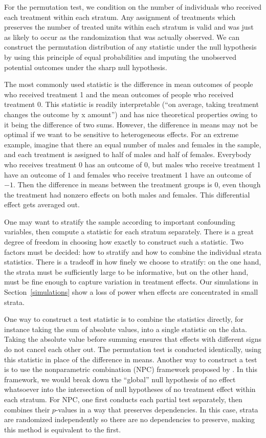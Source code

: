 \documentclass[11pt]{article}
\begin{document}
For the permutation test, we condition on the number of individuals who received each treatment within each stratum.
Any assignment of treatments which preserves the number of treated units within each stratum is valid and was just as likely to occur as the randomization that was actually observed.
We can construct the permutation distribution of any statistic under the null hypothesis by using this principle of equal probabilities and imputing the unobserved potential outcomes under the sharp null hypothesis.

The most commonly used statistic is the difference in mean outcomes of people who received treatment 1 and the mean outcomes of people who received treatment 0.  
This statistic is readily interpretable (``on average, taking treatment changes the outcome by x amount'') and has nice theoretical properties owing to it being the difference of two sums.
However, the difference in means may not be optimal if we want to be sensitive to heterogeneous effects.  
For an extreme example, imagine that there an equal number of males and females in the sample, and each treatment is assigned to half of males and half of females.  
Everybody who receives treatment 0 has an outcome of 0, but males who receive treatment 1 have an outcome of $1$ and females who receive treatment 1 have an outcome of $-1$.  
Then the difference in means between the treatment groups is $0$, even though the treatment had nonzero effects on both males and females.  
This differential effect gets averaged out.

One may want to stratify the sample according to important confounding variables, then compute a statistic for each stratum separately. 
There is a great degree of freedom in choosing how exactly to construct such a statistic.
Two factors must be decided: how to stratify and how to combine the individual strata statistics.
There is a tradeoff in how finely we choose to stratify:
on the one hand, the strata must be sufficiently large to be informative,
 but on the other hand, must be fine enough to capture variation in treatment effects.
Our simulations in Section~\ref{simulations} show a loss of power when effects are concentrated in small strata.

One way to construct a test statistic is to combine the statistics directly, for instance taking the sum of absolute values, into a single statistic on the data.
Taking the absolute value before summing ensures that effects with different signs do not cancel each other out.
The permutation test is conducted identically, using this statistic in place of the difference in means.
Another way to construct a test is to use the nonparametric combination (NPC) framework proposed by \citet{pesarin_permutation_2010}.
In this framework, we would break down the ``global'' null hypothesis of no effect whatsoever into the intersection of null hypotheses of no treatment effect within each stratum.
For NPC, one first conducts each partial test separately, then combines their $p$-values in a way that preserves dependencies.
In this case, strata are randomized independently so there are no dependencies to preserve, making this method is equivalent to the first.
\end{document}
